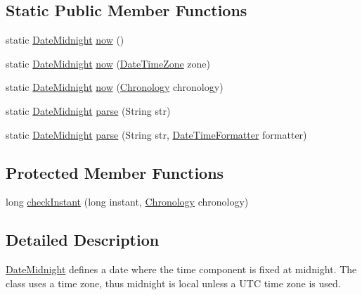 \subsection*{Static Public Member Functions}
\begin{DoxyCompactItemize}
\item 
static \hyperlink{classorg_1_1joda_1_1time_1_1_date_midnight}{Date\-Midnight} \hyperlink{classorg_1_1joda_1_1time_1_1_date_midnight_a336dd05779c4ccdaa69620ed5992ce0b}{now} ()
\item 
static \hyperlink{classorg_1_1joda_1_1time_1_1_date_midnight}{Date\-Midnight} \hyperlink{classorg_1_1joda_1_1time_1_1_date_midnight_af4ec5975f8b245ff90718aa38efb971c}{now} (\hyperlink{classorg_1_1joda_1_1time_1_1_date_time_zone}{Date\-Time\-Zone} zone)
\item 
static \hyperlink{classorg_1_1joda_1_1time_1_1_date_midnight}{Date\-Midnight} \hyperlink{classorg_1_1joda_1_1time_1_1_date_midnight_a841e99769fd75a3875a903d2226d8ec9}{now} (\hyperlink{classorg_1_1joda_1_1time_1_1_chronology}{Chronology} chronology)
\item 
static \hyperlink{classorg_1_1joda_1_1time_1_1_date_midnight}{Date\-Midnight} \hyperlink{classorg_1_1joda_1_1time_1_1_date_midnight_a4d945994a182a8ed1e2b293f7c7a1eff}{parse} (String str)
\item 
static \hyperlink{classorg_1_1joda_1_1time_1_1_date_midnight}{Date\-Midnight} \hyperlink{classorg_1_1joda_1_1time_1_1_date_midnight_aaf87c5b2556e567eaa6db650f7e79056}{parse} (String str, \hyperlink{classorg_1_1joda_1_1time_1_1format_1_1_date_time_formatter}{Date\-Time\-Formatter} formatter)
\end{DoxyCompactItemize}
\subsection*{Protected Member Functions}
\begin{DoxyCompactItemize}
\item 
long \hyperlink{classorg_1_1joda_1_1time_1_1_date_midnight_a7729e2612baef7f7119a3dd12257715b}{check\-Instant} (long instant, \hyperlink{classorg_1_1joda_1_1time_1_1_chronology}{Chronology} chronology)
\end{DoxyCompactItemize}


\subsection{Detailed Description}
\hyperlink{classorg_1_1joda_1_1time_1_1_date_midnight}{Date\-Midnight} defines a date where the time component is fixed at midnight. The class uses a time zone, thus midnight is local unless a U\-T\-C time zone is used. 

